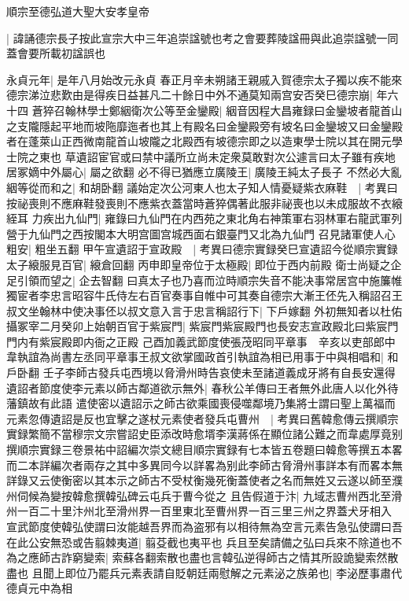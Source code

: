 順宗至德弘道大聖大安孝皇帝

|{
	諱誦德宗長子按此宣宗大中三年追崇諡號也考之會要葬陵諡冊與此追崇諡號一同蓋會要所載初諡誤也}


永貞元年|{
	是年八月始改元永貞}
春正月辛未朔諸王親戚入賀德宗太子獨以疾不能來德宗涕泣悲歎由是得疾日益甚凡二十餘日中外不通莫知兩宫安否癸巳德宗崩|{
	年六十四}
蒼猝召翰林學士鄭絪衛次公等至金鑾殿|{
	絪音因程大昌雍録曰金鑾坡者龍首山之支隴隱起平地而坡陁靡迤者也其上有殿名曰金鑾殿旁有坡名曰金鑾坡又曰金鑾殿者在蓬萊山正西微南龍首山坡隴之北殿西有坡德宗即之以造東學士院以其在開元學士院之東也}
草遺詔宦官或曰禁中議所立尚未定衆莫敢對次公遽言曰太子雖有疾地居冢嫡中外屬心|{
	屬之欲翻}
必不得已猶應立廣陵王|{
	廣陵王純太子長子}
不然必大亂絪等從而和之|{
	和胡卧翻}
議始定次公河東人也太子知人情憂疑紫衣麻鞋　|{
	考異曰按祕喪則不應麻鞋發喪則不應紫衣蓋當時蒼猝偶著此服非祕喪也以未成服故不衣縗絰耳}
力疾出九仙門|{
	雍錄曰九仙門在内西苑之東北角右神策軍右羽林軍右龍武軍列營于九仙門之西按閣本大明宫圖宫城西面右銀臺門又北為九仙門}
召見諸軍使人心粗安|{
	粗坐五翻}
甲午宣遺詔于宣政殿　|{
	考異曰德宗實録癸巳宣遺詔今從順宗實録}
太子縗服見百官|{
	縗倉回翻}
丙申即皇帝位于太極殿|{
	即位于西内前殿}
衛士尚疑之企足引領而望之|{
	企去智翻}
曰真太子也乃喜而泣時順宗失音不能决事常居宫中施簾帷獨宦者李忠言昭容牛氏侍左右百官奏事自帷中可其奏自德宗大漸王伾先入稱詔召王叔文坐翰林中使决事伾以叔文意入言于忠言稱詔行下|{
	下戶嫁翻}
外初無知者以杜佑攝冢宰二月癸卯上始朝百官于紫宸門|{
	紫宸門紫宸殿門也長安志宣政殿北曰紫宸門門内有紫宸殿即内衙之正殿}
己酉加義武節度使張茂昭同平章事　辛亥以吏部郎中韋執誼為尚書左丞同平章事王叔文欲掌國政首引執誼為相已用事于中與相唱和|{
	和戶卧翻}
壬子李師古發兵屯西境以脅滑州時告哀使未至諸道義成牙將有自長安還得遺詔者節度使李元素以師古鄰道欲示無外|{
	春秋公羊傳曰王者無外此唐人以化外待藩鎮故有此語}
遣使密以遺詔示之師古欲乘國喪侵噬鄰境乃集將士謂曰聖上萬福而元素忽傳遺詔是反也宜擊之遂杖元素使者發兵屯曹州　|{
	考異曰舊韓愈傳云撰順宗實録繁簡不當穆宗文宗嘗詔史臣添改時愈壻李漢蔣係在顯位諸公難之而韋處厚竟别撰順宗實録三卷景祐中詔編次崇文總目順宗實録有七本皆五卷題曰韓愈等撰五本畧而二本詳編次者兩存之其中多異同今以詳畧為别此李師古脅滑州事詳本有而畧本無詳錄又云使衡密以其本示之師古不受杖衡幾死衡蓋使者之名而無姓又云遂以師至濮州伺候為變按韓愈撰韓弘碑云屯兵于曹今從之}
且告假道于汴|{
	九域志曹州西北至滑州一百二十里汴州北至滑州界一百里東北至曹州界一百三里三州之界蓋犬牙相入}
宣武節度使韓弘使謂曰汝能越吾界而為盗邪有以相待無為空言元素告急弘使謂曰吾在此公安無恐或告翦棘夷道|{
	翦芟截也夷平也}
兵且至矣請備之弘曰兵來不除道也不為之應師古詐窮變索|{
	索蘇各翻索散也盡也言韓弘逆得師古之情其所設詭變索然散盡也}
且聞上即位乃罷兵元素表請自貶朝廷兩慰解之元素泌之族弟也|{
	李泌歷事肅代德貞元中為相}
